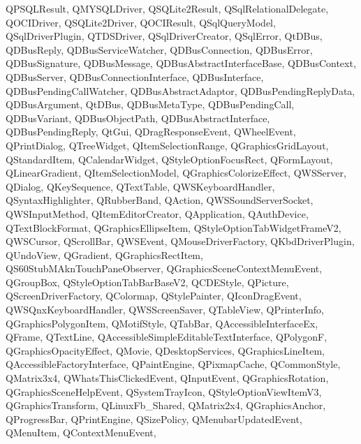 {{    QPSQLResult,%
    QMYSQLDriver,%
    QSQLite2Result,%
    QSqlRelationalDelegate,%
    QOCIDriver,%
    QSQLite2Driver,%
    QOCIResult,%
    QSqlQueryModel,%
    QSqlDriverPlugin,%
    QTDSDriver,%
    QSqlDriverCreator,%
    QSqlError,%
    QtDBus,%
    QDBusReply,%
    QDBusServiceWatcher,%
    QDBusConnection,%
    QDBusError,%
    QDBusSignature,%
    QDBusMessage,%
    QDBusAbstractInterfaceBase,%
    QDBusContext,%
    QDBusServer,%
    QDBusConnectionInterface,%
    QDBusInterface,%
    QDBusPendingCallWatcher,%
    QDBusAbstractAdaptor,%
    QDBusPendingReplyData,%
    QDBusArgument,%
    QtDBus,%
    QDBusMetaType,%
    QDBusPendingCall,%
    QDBusVariant,%
    QDBusObjectPath,%
    QDBusAbstractInterface,%
    QDBusPendingReply,%
    QtGui,%
    QDragResponseEvent,%
    QWheelEvent,%
    QPrintDialog,%
    QTreeWidget,%
    QItemSelectionRange,%
    QGraphicsGridLayout,%
    QStandardItem,%
    QCalendarWidget,%
    QStyleOptionFocusRect,%
    QFormLayout,%
    QLinearGradient,%
    QItemSelectionModel,%
    QGraphicsColorizeEffect,%
    QWSServer,%
    QDialog,%
    QKeySequence,%
    QTextTable,%
    QWSKeyboardHandler,%
    QSyntaxHighlighter,%
    QRubberBand,%
    QAction,%
    QWSSoundServerSocket,%
    QWSInputMethod,%
    QItemEditorCreator,%
    QApplication,%
    QAuthDevice,%
    QTextBlockFormat,%
    QGraphicsEllipseItem,%
    QStyleOptionTabWidgetFrameV2,%
    QWSCursor,%
    QScrollBar,%
    QWSEvent,%
    QMouseDriverFactory,%
    QKbdDriverPlugin,%
    QUndoView,%
    QGradient,%
    QGraphicsRectItem,%
    QS60StubMAknTouchPaneObserver,%
    QGraphicsSceneContextMenuEvent,%
    QGroupBox,%
    QStyleOptionTabBarBaseV2,%
    QCDEStyle,%
    QPicture,%
    QScreenDriverFactory,%
    QColormap,%
    QStylePainter,%
    QIconDragEvent,%
    QWSQnxKeyboardHandler,%
    QWSScreenSaver,%
    QTableView,%
    QPrinterInfo,%
    QGraphicsPolygonItem,%
    QMotifStyle,%
    QTabBar,%
    QAccessibleInterfaceEx,%
    QFrame,%
    QTextLine,%
    QAccessibleSimpleEditableTextInterface,%
    QPolygonF,%
    QGraphicsOpacityEffect,%
    QMovie,%
    QDesktopServices,%
    QGraphicsLineItem,%
    QAccessibleFactoryInterface,%
    QPaintEngine,%
    QPixmapCache,%
    QCommonStyle,%
    QMatrix3x4,%
    QWhatsThisClickedEvent,%
    QInputEvent,%
    QGraphicsRotation,%
    QGraphicsSceneHelpEvent,%
    QSystemTrayIcon,%
    QStyleOptionViewItemV3,%
    QGraphicsTransform,%
    QLinuxFb_Shared,%
    QMatrix2x4,%
    QGraphicsAnchor,%
    QProgressBar,%
    QPrintEngine,%
    QSizePolicy,%
    QMenubarUpdatedEvent,%
    QMenuItem,%
    QContextMenuEvent,%
}}
